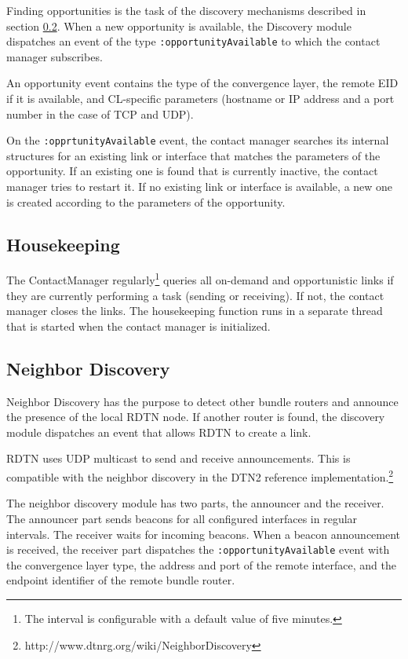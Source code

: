 \documentclass[a4paper]{article}
\begin{document}
Finding opportunities is the task of the discovery mechanisms described in
section \ref{sec.discovery}.  When a new opportunity is available, the Discovery
module dispatches an event of the type {\tt :opportunityAvailable} to which the
contact manager subscribes.

An opportunity event contains the type of the convergence layer, the remote EID
if it is available, and CL-specific parameters (hostname or IP address and a
port number in the case of TCP and UDP).

On the {\tt :opprtunityAvailable} event, the contact manager searches its
internal structures for an existing link or interface that matches the
parameters of the opportunity. If an existing one is found that is currently
inactive, the contact manager tries to restart it. If no existing link or
interface is available, a new one is created according to the parameters of the
opportunity.

\subsection{Housekeeping}

The ContactManager regularly\footnote{The interval is configurable with a
default value of five minutes.} queries all on-demand and opportunistic links if
they are currently performing a task (sending or receiving). If not, the contact
manager closes the links.  The housekeeping function runs in a separate thread
that is started when the contact manager is initialized.

\subsection{Neighbor Discovery}\label{sec.discovery}

Neighbor Discovery has the purpose to detect other bundle routers and announce
the presence of the local RDTN node. If another router is found, the
discovery module dispatches an event that allows RDTN to create a link.

RDTN uses UDP multicast to send and receive announcements. This is compatible
with the neighbor discovery in the DTN2 reference
implementation.\footnote{http://www.dtnrg.org/wiki/NeighborDiscovery} 

The neighbor discovery module has two parts, the announcer and the receiver. The
announcer part sends beacons for all configured interfaces in regular intervals.
The receiver waits for incoming beacons. When a beacon announcement is received,
the receiver part dispatches the {\tt :opportunityAvailable} event with the
convergence layer type, the address and port of the remote interface, and the
endpoint identifier of the remote bundle router.
\end{document}
